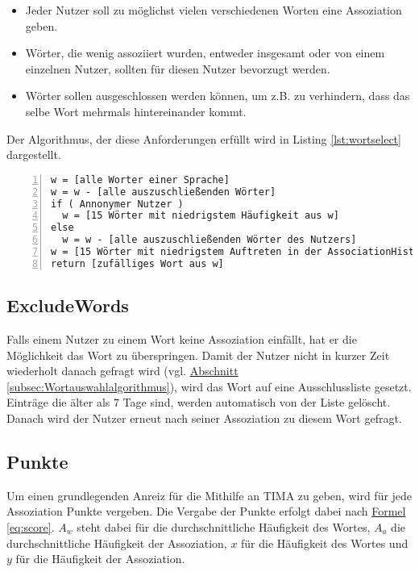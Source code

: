 \begin{itemize}
	\item Jeder Nutzer soll zu möglichst vielen verschiedenen Worten eine Assoziation geben.
	\item Wörter, die wenig assoziiert wurden, entweder insgesamt oder von einem einzelnen Nutzer, sollten für diesen Nutzer bevorzugt werden.
	\item Wörter sollen ausgeschlossen werden können, um z.B. zu verhindern, dass das selbe Wort mehrmals hintereinander kommt.
\end{itemize}

Der Algorithmus, der diese Anforderungen erfüllt wird in Listing \ref{lst:wortselect} dargestellt.

\begin{lstlisting}[basicstyle=\ttfamily,
backgroundcolor=\color{lightgray},
showspaces=false,
showstringspaces=false,
showtabs=false,
columns=fixed,
frame=lines,
numbers=left,
numbersep=5pt,
breaklines=true,
captionpos=b,
label=lst:wortselect,
caption=Wortauswahlalgorithmus]
w = [alle Worter einer Sprache]
w = w - [alle auszuschließenden Wörter]
if ( Annonymer Nutzer )
  w = [15 Wörter mit niedrigstem Häufigkeit aus w]
else
  w = w - [alle auszuschließenden Wörter des Nutzers]
w = [15 Wörter mit niedrigstem Auftreten in der AssociationHistory des Buntzers1 aus w]
return [zufälliges Wort aus w]
\end{lstlisting}

\subsection{ExcludeWords}\label{subsec:excludewords}
Falls einem Nutzer zu einem Wort keine Assoziation einfällt, hat er die
Möglichkeit das Wort zu überspringen. Damit der Nutzer nicht in kurzer Zeit
wiederholt danach gefragt wird (vgl.
\hyperref[subsec:Wortauswahlalgorithmus]
{Abschnitt \ref*{subsec:Wortauswahlalgorithmus}}), wird das Wort auf eine
Ausschlussliste gesetzt. Einträge die älter als 7 Tage sind, werden
automatisch von der Liste gelöscht. Danach wird der Nutzer erneut nach
seiner Assoziation zu diesem Wort gefragt.

\subsection{Punkte}\label{subsec:punkte}
Um einen grundlegenden Anreiz für die  Mithilfe an TIMA zu geben, wird für jede Assoziation Punkte vergeben. Die Vergabe der Punkte erfolgt dabei nach \hyperref[eq:score]{Formel \ref*{eq:score}}. $ A_w $ steht dabei für die durchschnittliche Häufigkeit des Wortes, $ A_a $ die durchschnittliche Häufigkeit der Assoziation, $ x $ für die Häufigkeit des Wortes und $ y $ für die Häufigkeit der Assoziation.

